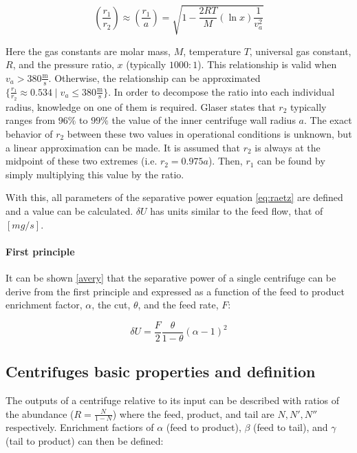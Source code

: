 \begin{equation}
    (\frac{r_1}{r_2}) \approx (\frac{r_1}{a}) = \sqrt{1 - \frac{2RT}{M}(\ln x)\frac{1}{v_{a}^{2}}}
\end{equation}

Here the gas constants are molar mass, $M$, temperature $T$, universal gas constant, $R$,
and the pressure ratio, $x$ (typically $1000:1$).
This relationship is valid when $v_a > 380 \frac{\mathrm{m}}{\mathrm{s}}$.
Otherwise, the relationship can be approximated $\{\frac{r_1}{r_2} \approx 0.534 \mid v_a \leq 380 \frac{\mathrm{m}}{\mathrm{s}}\}$.
In order to decompose the ratio into each individual radius, knowledge on one
of them is required. Glaser \cite{glaser.2008} states that $r_2$ typically ranges
from $96\%$ to $99\%$ the value of the inner centrifuge wall radius $a$. The exact
behavior of $r_2$ between these two values in operational conditions is unknown,
but a linear approximation can be made. It is assumed that $r_2$ is always at
the midpoint of these two extremes (i.e. $r_2 = 0.975 a$). Then, $r_1$ can be
found by simply multiplying this value by the ratio.

With this, all parameters of the separative power equation \ref{eq:raetz} are
defined and a value can be calculated. $\delta U$ has units similar to the feed
flow, that of $[mg/s]$.

\paragraph{First principle}

It can be shown \ref{avery} that the separative power of a single centrifuge can be
derive from the first principle and expressed as a function of the feed to
product enrichment factor, $\alpha$, the cut, $\theta$, and the feed rate, $F$:

\begin{equation} \label{eq_alpha_principle}
    \delta U = \frac{F}{2}\frac{\theta}{1-\theta}(\alpha-1)^{2}
\end{equation}

\subsection{Centrifuges basic properties and definition}

The outputs of a centrifuge relative to its input can be described with ratios
of the abundance ($R = \frac{N}{1-N}$) where the feed, product, and tail are
$N, N', N''$ respectively. Enrichment factiors of $\alpha$ (feed to product),
$\beta$ (feed to tail), and $\gamma$ (tail to product) can then be defined:

